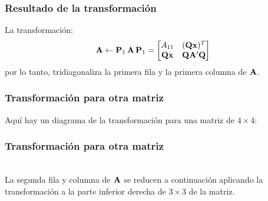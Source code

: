 \documentclass[12pt]{beamer}
\begin{document}
\begin{frame}
\frametitle{Resultado de la transformación}
La transformación:
\pause
\begin{align}
\vb{A} \leftarrow \vb{P}_{1} \, \vb{A} \, \vb{P}_{1} =
\begin{bmatrix}
A_{11} & (\vb{Q x})^{T} \\
\vb{Q x} & \vb{Q \ensuremath{{A}^{\prime}} Q}
\end{bmatrix}
\label{eq:ecuacion_09_41}
\end{align}
por lo tanto, tridiagonaliza la primera fila y la primera columna de $\vb{A}$.
\end{frame}
\begin{frame}
\frametitle{Transformación para otra matriz}
Aquí hay un diagrama de la transformación para una matriz de $4 \times 4$:
\pause
{}
\end{frame}
\begin{frame}
\frametitle{Transformación para otra matriz}
\\
La segunda fila y columna de $\vb{A}$ se reducen a continuación aplicando la transformación a la parte inferior derecha de $3 \times 3$ de la matriz.
\end{frame}
\end{document}
